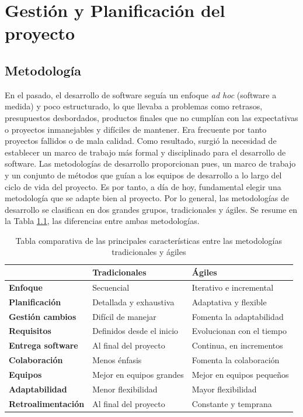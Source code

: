\chapter{Gestión y Planificación del proyecto}


\section{Metodología}

En el pasado, el desarrollo de software seguía un enfoque \textit{ad hoc} (software a medida) y poco estructurado, lo que llevaba a problemas como retrasos, presupuestos desbordados, productos finales que no cumplían con las expectativas o proyectos inmanejables y difíciles de mantener. Era frecuente por tanto proyectos fallidos o de mala calidad. Como resultado, surgió la necesidad de establecer un marco de trabajo más formal y disciplinado para el desarrollo de software. Las metodologías de desarrollo proporcionan pues, un marco de trabajo y un conjunto de métodos que guían a los equipos de desarrollo a lo largo del ciclo de vida del proyecto. Es por tanto, a día de hoy, fundamental elegir una metodología que se adapte bien al proyecto.
Por lo general, las metodologías de desarrollo se clasifican en dos grandes grupos, tradicionales y ágiles. Se resume en la Tabla \ref{tabla:resumen_trad_agil}, las diferencias entre ambas metodologías. 


\begin{table}[h!]
    \centering
    \begin{tabular}[t]{lll}
        \toprule
         & \textbf{Tradicionales} & \textbf{Ágiles} \\
        \midrule
        \textbf{Enfoque} & Secuencial & Iterativo e incremental   \\
        \midrule
        \textbf{Planificación} & Detallada y exhaustiva & Adaptativa y flexible   \\
        \midrule
        \textbf{Gestión cambios} & Difícil de manejar & Fomenta la adaptabilidad   \\
        \midrule
        \textbf{Requisitos} & Definidos desde el inicio & Evolucionan con el tiempo     \\
        \midrule
       \textbf{Entrega software} & Al final del proyecto & Continua, en incrementos      \\
        \midrule
        \textbf{Colaboración} & Menos énfasis & Fomenta la colaboración      \\
        \midrule
        \textbf{Equipos} & Mejor en equipos grandes & Mejor en equipos pequeños      \\
        \midrule
        \textbf{Adaptabilidad} & Menor flexibilidad & Mayor flexibilidad      \\
        \midrule
        \textbf{Retroalimentación} & Al final del proyecto & Constante y temprana      \\
        \bottomrule
    \end{tabular}
    \caption{Tabla comparativa de las principales características entre las metodologías tradicionales y ágiles}
    \label{tabla:resumen_trad_agil}
\end{table}


